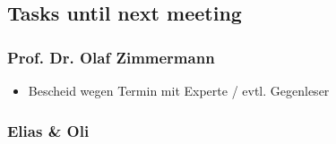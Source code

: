 \hypertarget{tasks-until-next-meeting}{%
\subsection*{Tasks until next meeting}\label{tasks-until-next-meeting}}

\hypertarget{prof-dr-olaf-zimmermann}{%
\subsubsection*{Prof. Dr. Olaf
Zimmermann}\label{prof-dr-olaf-zimmermann}}

\begin{itemize}

\item
  Bescheid wegen Termin mit Experte / evtl. Gegenleser
\end{itemize}

\hypertarget{elias--oli}{%
\subsubsection*{Elias \& Oli}\label{elias--oli}}